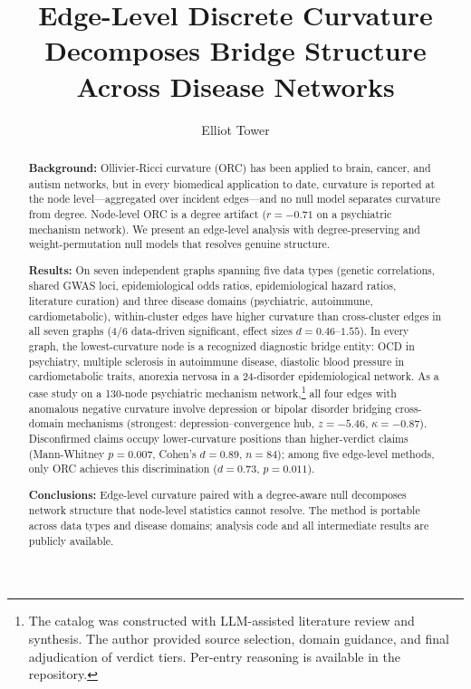 \documentclass[11pt]{article}
\title{Edge-Level Discrete Curvature Decomposes Bridge Structure Across Disease Networks}
\author{Elliot Tower}
\affil{Independent researcher \\ \texttt{elliot@elliottower.ai}}
\date{}
\begin{document}
\maketitle

\begin{abstract}
\textbf{Background:}
Ollivier-Ricci curvature (ORC) has been applied to brain, cancer, and autism networks, but in every biomedical application to date, curvature is reported at the node level---aggregated over incident edges---and no null model separates curvature from degree. Node-level ORC is a degree artifact ($r = -0.71$ on a psychiatric mechanism network). We present an edge-level analysis with degree-preserving and weight-permutation null models that resolves genuine structure.

\textbf{Results:}
On seven independent graphs spanning five data types (genetic correlations, shared GWAS loci, epidemiological odds ratios, epidemiological hazard ratios, literature curation) and three disease domains (psychiatric, autoimmune, cardiometabolic), within-cluster edges have higher curvature than cross-cluster edges in all seven graphs (4/6 data-driven significant, effect sizes $d = 0.46$--$1.55$). In every graph, the lowest-curvature node is a recognized diagnostic bridge entity: OCD in psychiatry, multiple sclerosis in autoimmune disease, diastolic blood pressure in cardiometabolic traits, anorexia nervosa in a 24-disorder epidemiological network. As a case study on a 130-node psychiatric mechanism network,\footnote{The catalog was constructed with LLM-assisted literature review and synthesis. The author provided source selection, domain guidance, and final adjudication of verdict tiers. Per-entry reasoning is available in the repository.} all four edges with anomalous negative curvature involve depression or bipolar disorder bridging cross-domain mechanisms (strongest: depression--convergence hub, $z = -5.46$, $\kappa = -0.87$). Disconfirmed claims occupy lower-curvature positions than higher-verdict claims (Mann-Whitney $p = 0.007$, Cohen's $d = 0.89$, $n = 84$); among five edge-level methods, only ORC achieves this discrimination ($d = 0.73$, $p = 0.011$).

\textbf{Conclusions:}
Edge-level curvature paired with a degree-aware null decomposes network structure that node-level statistics cannot resolve. The method is portable across data types and disease domains; analysis code and all intermediate results are publicly available.
\end{abstract}
\end{document}
